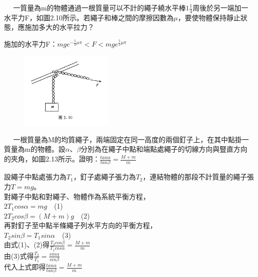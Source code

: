 \documentclass[cn,10pt,math=newtx,chinesefont=founder]{../elegantbook}
\begin{document}
\newpage


\begin{example}　
    一質量為m的物體通過一根質量可以不計的繩子繞水平棒$1\frac{1}{4}$周後於另一端加一水平力F，如圖2.10所示。若繩子和棒之間的摩擦因數為$\mu$，要使物體保持靜止狀態，應施加多大的水平拉力？
    
    \rightline{[2.1.11]}
\end{example}

\begin{solution}
施加的水平力F：$mge^{-\frac{5}{2}\mu\pi} < F < mge^{\frac{5}{2}\mu\pi}$
\end{solution}

\begin{figure}[htbp]
\flushright
\includegraphics[width=0.4\textwidth]{image/2.10.JPG}
\end{figure}

\newpage


\begin{example}　
    一根質量為M的均質繩子，兩端固定在同一高度的兩個釘子上，在其中點掛一質量為m的物體。設$\alpha$、$\beta$分別為在繩子中點和端點處繩子的切線方向與豎直方向的夾角，如圖2.13所示。證明：$\frac{tan\alpha}{tan\beta} = \frac{M+m}{m}$
    
    \rightline{[2.1.12]}
\end{example}

\begin{solution}
設繩子中點處張力為$T_1$，釘子處繩子張力為$T_2$，連結物體的那段不計質量的繩子張力$T=mg$。\\
對繩子中點和對繩子、物體作為系統平衡方程，\\
$2T_1cos\alpha = mg$　(1)\\
$2T_2cos\beta = (M+m)g$　(2)\\
再對釘子至中點半條繩子列水平方向的平衡方程，\\
$T_2sin\beta = T_1sin\alpha$　(3)\\
由式(1)、(2)得$\frac{T_2cos\beta}{T_1cos\alpha} = \frac{M+m}{m}$\\
由(3)式得$\frac{T_2}{T_1} = \frac{sin\alpha}{sin\beta}$\\
代入上式即得$\frac{tan\alpha}{tan\beta} = \frac{M+m}{m}$
\end{solution}
\end{document}
